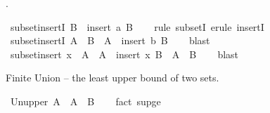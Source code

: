 \begin{isabellebody}
\endisatagproof
{\isafoldproof}%
%
\isadelimproof
%
\endisadelimproof
%
\isadelimdocument
%
\endisadelimdocument
%
\isatagdocument
%
\isamarkuptrue%
%
\endisatagdocument
{\isafolddocument}%
%
\isadelimdocument
%
\endisadelimdocument
%
\begin{isamarkuptext}%
.%
\end{isamarkuptext}\isamarkuptrue%
\isamarkupfalse%
\ subset{\isacharunderscore}{\kern0pt}insertI{\isacharcolon}{\kern0pt}\ {\isachardoublequoteopen}B\ {\isasymsubseteq}\ insert\ a\ B{\isachardoublequoteclose}\isanewline
%
\isadelimproof
\ \ %
\endisadelimproof
%
\isatagproof
{}\isamarkupfalse%
\ {\isacharparenleft}{\kern0pt}rule\ subsetI{\isacharparenright}{\kern0pt}\ {\isacharparenleft}{\kern0pt}erule\ insertI{}{\isacharparenright}{\kern0pt}%
\endisatagproof
{\isafoldproof}%
%
\isadelimproof
\isanewline
%
\endisadelimproof
\isanewline
{}\isamarkupfalse%
\ subset{\isacharunderscore}{\kern0pt}insertI{}{\isacharcolon}{\kern0pt}\ {\isachardoublequoteopen}A\ {\isasymsubseteq}\ B\ {\isasymLongrightarrow}\ A\ {\isasymsubseteq}\ insert\ b\ B{\isachardoublequoteclose}\isanewline
%
\isadelimproof
\ \ %
\endisadelimproof
%
\isatagproof
{}\isamarkupfalse%
\ blast%
\endisatagproof
{\isafoldproof}%
%
\isadelimproof
\isanewline
%
\endisadelimproof
\isanewline
{}\isamarkupfalse%
\ subset{\isacharunderscore}{\kern0pt}insert{\isacharcolon}{\kern0pt}\ {\isachardoublequoteopen}x\ {\isasymnotin}\ A\ {\isasymLongrightarrow}\ A\ {\isasymsubseteq}\ insert\ x\ B\ {\isasymlongleftrightarrow}\ A\ {\isasymsubseteq}\ B{\isachardoublequoteclose}\isanewline
%
\isadelimproof
\ \ %
\endisadelimproof
%
\isatagproof
{}\isamarkupfalse%
\ blast%
\endisatagproof
{\isafoldproof}%
%
\isadelimproof
%
\endisadelimproof
%
\begin{isamarkuptext}%
\medskip Finite Union -- the least upper bound of two sets.%
\end{isamarkuptext}\isamarkuptrue%
\isamarkupfalse%
\ Un{\isacharunderscore}{\kern0pt}upper{}{\isacharcolon}{\kern0pt}\ {\isachardoublequoteopen}A\ {\isasymsubseteq}\ A\ {\isasymunion}\ B{\isachardoublequoteclose}\isanewline
%
\isadelimproof
\ \ %
\endisadelimproof
%
\isatagproof
{}\isamarkupfalse%
\ {\isacharparenleft}{\kern0pt}fact\ sup{\isacharunderscore}{\kern0pt}ge{}{\isacharparenright}{\kern0pt}%
\endisatagproof
{\isafoldproof}%
%
\isadelimproof

\end{isabellebody}
